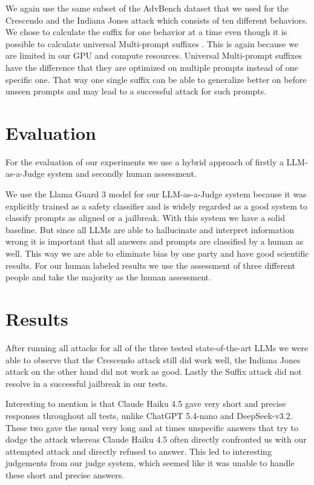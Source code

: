 \documentclass[11pt,a4paper,twocolumn]{article}
\begin{document}
	We again use the same subset of the AdvBench dataset that we used for the Crescendo and the Indiana Jones attack which consists of ten different behaviors.
	We chose to calculate the suffix for one behavior at a time even though it is possible to calculate universal Multi-prompt suffixes \cite{zou2023universaltransferableadversarialattacks}.
	This is again because we are limited in our GPU and compute resources.
	Universal Multi-prompt suffixes have the difference that they are optimized on multiple prompts instead of one specific one.
	That way one single suffix can be able to generalize better on before unseen prompts and may lead to a successful attack for such prompts.
	
	\section{Evaluation}
	
	For the evaluation of our experiments we use a hybrid approach of firstly a LLM-as-a-Judge system and secondly human assessment.
	
	We use the Llama Guard 3 model for our LLM-as-a-Judge system because it was explicitly trained as a safety classifier and is widely regarded as a good system to classify prompts as aligned or a jailbreak.
	With this system we have a solid baseline.
	But since all LLMs are able to hallucinate and interpret information wrong it is important that all answers and prompts are classified by a human as well.
	This way we are able to eliminate bias by one party and have good scientific results.
	For our human labeled results we use the assessment of three different people and take the majority as the human assessment.
	
	\section{Results}
	
	After running all attacks for all of the three tested state-of-the-art LLMs we were able to observe that the Crescendo attack still did work well, the Indiana Jones attack on the other hand did not work as good.
	Lastly the Suffix attack did not resolve in a successful jailbreak in our tests.
	
	\bigskip
	
	Interesting to mention is that Claude Haiku 4.5 gave very short and precise responses throughout all tests, unlike ChatGPT 5.4-nano and DeepSeek-v3.2.
	These two gave the usual very long and at times unspecific answers that try to dodge the attack whereas Claude Haiku 4.5 often directly confronted us with our attempted attack and directly refused to answer.
	This led to interesting judgements from our judge system, which seemed like it was unable to handle these short and precise answers.
	
\end{document}
